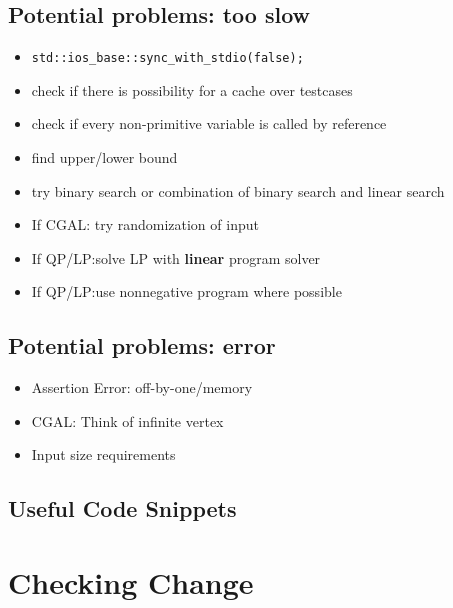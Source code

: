 \documentclass[a4paper, 10pt]{article}
\let\stdsection\section
\renewcommand\section{\newpage\stdsection}
\newcommand{\includecode}[1]{
    }
\newcommand{\algoAuthor}{2} %
\begin{document}
        \subsection*{Potential problems: too slow}
            \begin{itemize}
                \item \texttt{std::ios\_base::sync\_with\_stdio(false);}
                \item check if there is possibility for a cache over testcases
                \item check if every non-primitive variable is called by reference
                \item find upper/lower bound
                \item try binary search or combination of binary search and linear search
                \item If CGAL: try randomization of input
                \item If QP/LP:solve LP with \textbf{linear} program solver
                \item If QP/LP:use nonnegative program where possible
            \end{itemize}

        \subsection*{Potential problems: error}
            \begin{itemize}
                \item Assertion Error: off-by-one/memory
                \item CGAL: Think of infinite vertex
                \item Input size requirements
            \end{itemize}

        \subsection*{Useful Code Snippets}
            \label{sec:misc}
            \includecode{./misc.cpp}


    
    \section{Checking Change}
        \label{sec:checking_change}
        \includecode{../problems/w01/Checking_Change/CheckingChange\algoAuthor.cpp}
    
\end{document}
